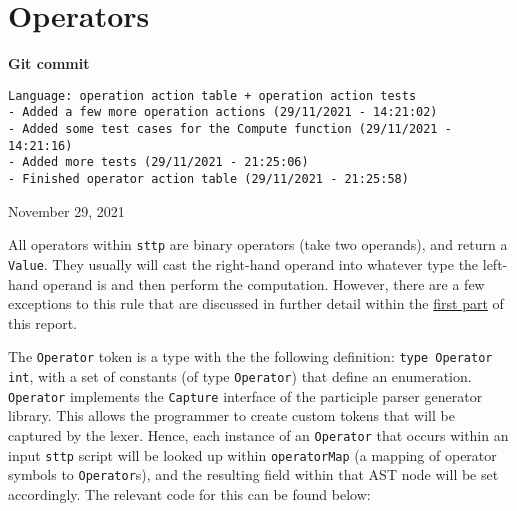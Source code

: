 \section{Operators}
\label{sec:development-operators}

\begin{center}
    \textbf{Git commit}
    \begin{verbatim}
Language: operation action table + operation action tests
- Added a few more operation actions (29/11/2021 - 14:21:02)
- Added some test cases for the Compute function (29/11/2021 - 14:21:16)
- Added more tests (29/11/2021 - 21:25:06)
- Finished operator action table (29/11/2021 - 21:25:58)
    \end{verbatim}
    \vspace{-1em}
    \tiny{November 29, 2021}
\end{center}

All operators within \verb|sttp| are binary operators (take two operands), and return a \verb|Value|. They usually will cast the right-hand operand into whatever type the left-hand operand is and then perform the computation. However, there are a few exceptions to this rule that are discussed in further detail within the \hyperref[sec:hello-sttp-operators]{first part} of this report.

The \verb|Operator| token is a type with the the following definition: \texttt{type Operator int}, with a set of constants (of type \verb|Operator|) that define an enumeration. \verb|Operator| implements the \verb|Capture| interface of the participle parser generator library. This allows the programmer to create custom tokens that will be captured by the lexer. Hence, each instance of an \verb|Operator| that occurs within an input \verb|sttp| script will be looked up within \verb|operatorMap| (a mapping of operator symbols to \verb|Operator|s), and the resulting field within that AST node will be set accordingly. The relevant code for this can be found below:

\inputminted[firstline=13, lastline=71, autogobble, breaklines, tabsize=4]{go}{../../src/eval/operators.go}

